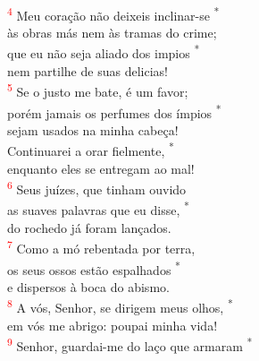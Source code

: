 \documentclass{book}
\begin{document}
\begin{center}
    \vspace{.2cm} \\
    \textsuperscript{\underline{\hspace{.07in}}\textcolor{red}{4}} Meu coração não deixeis inclinar-se \textsuperscript{*} \\
    às obras más nem às tramas do crime;\\
    \textsuperscript{\underline{\hspace{.07in}}} que eu não seja aliado dos impios \textsuperscript{*} \\
    nem partilhe de suas delicias!
    \vspace{.2cm} \\
    \textsuperscript{\underline{\hspace{.07in}}\textcolor{red}{5}} Se o justo me bate, é um favor; \dag{} \\
    porém jamais os perfumes dos ímpios \textsuperscript{*} \\
    sejam usados na minha cabeça! \\
    \textsuperscript{\underline{\hspace{.07in}}} Continuarei a orar fielmente, \textsuperscript{*} \\
    enquanto eles se entregam ao mal!
    \vspace{.2cm} \\
    \textsuperscript{\underline{\hspace{.07in}}\textcolor{red}{6}} Seus juízes, que tinham ouvido  \dag{} \\
    as suaves palavras que eu disse, \textsuperscript{*} \\
    do rochedo já foram lançados. \\
    \textsuperscript{\underline{\hspace{.07in}}\textcolor{red}{7}} Como a mó rebentada por terra, \dag{} \\
    os seus ossos estão espalhados \textsuperscript{*} \\
    e dispersos à boca do abismo.
    \vspace{.2cm} \\
    \textsuperscript{\underline{\hspace{.07in}}\textcolor{red}{8}} A vós, Senhor, se dirigem meus olhos, \textsuperscript{*} \\
    em vós me abrigo: poupai minha vida! \\
    \textsuperscript{\underline{\hspace{.07in}}\textcolor{red}{9}} Senhor, guardai-me do laço que armaram \textsuperscript{*} \\

\end{center}
\end{document}
